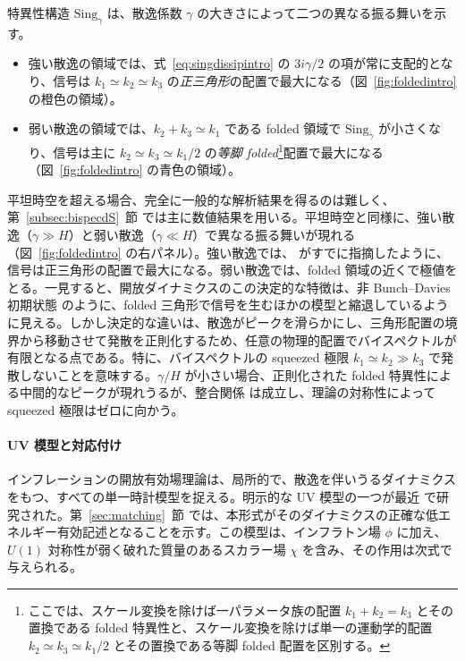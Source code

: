 \documentclass[a4paper,11pt]{ltjsarticle}
\numberwithin{equation}{section}
\newcommand{\Eq}[1]{Eq.~(\ref{#1})}
\newcommand{\Fig}[1]{Fig.~{\ref{#1}}}
\newcommand{\Sec}[1]{Sec.~\ref{#1}}
\renewcommand{\Eq}[1]{式~\eqref{#1}}
\renewcommand{\Fig}[1]{図~\ref{#1}}
\renewcommand{\Sec}[1]{第~\ref{#1}~節}
\begin{document}
特異性構造 $\mathrm{Sing}_\gamma$ は、散逸係数 $\gamma$ の大きさによって二つの異なる振る舞いを示す。
\begin{itemize}
\item 強い散逸の領域では、\Eq{eq:singdissipintro} の $3i\gamma/2$ の項が常に支配的となり、信号は $k_1\simeq k_2\simeq k_3$ の\textit{正三角形}の配置で最大になる（\Fig{fig:foldedintro} の橙色の領域）。
\item 弱い散逸の領域では、$k_2+k_3\simeq k_1$ である folded 領域で $\mathrm{Sing}_\gamma$ が小さくなり、信号は主に $k_2\simeq k_3\simeq k_1/2$ の\textit{等脚 folded}\footnote{ここでは、スケール変換を除けば一パラメータ族の配置 $k_1+k_2=k_3$ とその置換である folded 特異性と、スケール変換を除けば単一の運動学的配置 $k_2\simeq k_3\simeq k_1/2$ とその置換である等脚 folded 配置を区別する。}配置で最大になる（\Fig{fig:foldedintro} の青色の領域）。
\end{itemize}
平坦時空を超える場合、完全に一般的な解析結果を得るのは難しく、\Sec{subsec:bispecdS} では主に数値結果を用いる。平坦時空と同様に、強い散逸（$\gamma\gg H$）と弱い散逸（$\gamma\ll H$）で異なる振る舞いが現れる（\Fig{fig:foldedintro} の右パネル）。強い散逸では、\cite{LopezNacir:2011kk} がすでに指摘したように、信号は正三角形の配置で最大になる。弱い散逸では、folded 領域の近くで極値をとる。一見すると、開放ダイナミクスのこの決定的な特徴は、非 Bunch--Davies 初期状態 \cite{Holman:2007na,Chen:2006nt,Meerburg:2009ys,Agullo:2010ws,Ashoorioon:2010xg,Agarwal:2012mq,Ashoorioon:2013eia,Albrecht:2014aga,Green:2020whw} のように、folded 三角形で信号を生むほかの模型と縮退しているように見える。しかし決定的な違いは、散逸がピークを滑らかにし、三角形配置の境界から移動させて発散を正則化するため、任意の物理的配置でバイスペクトルが有限となる点である。特に、バイスペクトルの squeezed 極限 $k_1\simeq k_2\gg k_3$ で発散しないことを意味する。$\gamma/H$ が小さい場合、正則化された folded 特異性による中間的なピークが現れうるが、整合関係 \cite{Maldacena:2002vr,Creminelli:2004yq,Cheung:2007sv,Creminelli:2012ed,Hinterbichler:2012nm,Assassi:2012zq,Pajer:2017hmb,Avis:2019eav} は成立し、理論の対称性によって squeezed 極限はゼロに向かう。

\paragraph{UV 模型と対応付け} インフレーションの開放有効場理論は、局所的で、散逸を伴いうるダイナミクスをもつ、すべての単一時計模型を捉える。明示的な UV 模型の一つが最近 \cite{Creminelli:2023aly} で研究された。\Sec{sec:matching} では、本形式がそのダイナミクスの正確な低エネルギー有効記述となることを示す。この模型は、インフラトン場 $\phi$ に加え、$U(1)$ 対称性が弱く破れた質量のあるスカラー場 $\chi$ を含み、その作用は次式で与えられる。
\end{document}
